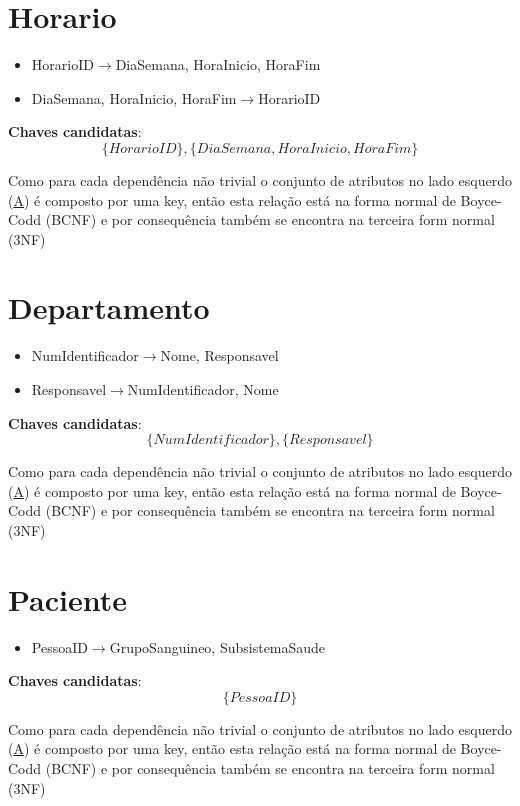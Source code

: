 \documentclass[article, a4paper, 12pt, oneside]{memoir}
\begin{document}
\newpage

\section*{Horario}
\begin{itemize}
	\item HorarioID$\rightarrow$DiaSemana, HoraInicio, HoraFim
	\item DiaSemana, HoraInicio, HoraFim$\rightarrow$HorarioID
\end{itemize}

\textbf{Chaves candidatas}:\\
\[
\{ HorarioID \}, \{ DiaSemana, HoraInicio, HoraFim \}
\]

Como para cada dependência não trivial o conjunto de atributos no lado esquerdo (\underline{A}) é composto por uma key, então esta relação está na forma normal de Boyce-Codd (BCNF) e por consequência também se encontra na terceira form normal (3NF)

\section*{Departamento}
\begin{itemize}
	\item NumIdentificador$\rightarrow$Nome, Responsavel
	\item Responsavel$\rightarrow$NumIdentificador, Nome
\end{itemize}

\textbf{Chaves candidatas}:\\
\[
\{ NumIdentificador \}, \{ Responsavel \}
\]

Como para cada dependência não trivial o conjunto de atributos no lado esquerdo (\underline{A}) é composto por uma key, então esta relação está na forma normal de Boyce-Codd (BCNF) e por consequência também se encontra na terceira form normal (3NF)

\section*{Paciente}
\begin{itemize}
	\item PessoaID$\rightarrow$GrupoSanguineo, SubsistemaSaude
\end{itemize}

\textbf{Chaves candidatas}:\\
\[
\{ PessoaID \}
\]

Como para cada dependência não trivial o conjunto de atributos no lado esquerdo (\underline{A}) é composto por uma key, então esta relação está na forma normal de Boyce-Codd (BCNF) e por consequência também se encontra na terceira form normal (3NF)
\end{document}
